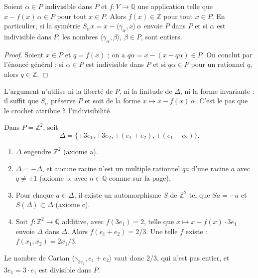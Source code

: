 \begin{enonce}
Soient $\alpha \in P$ indivisible dans $P$ et $f : V \to \mathbb Q$ une application telle que $x - f(x)\,\alpha \in P$ pour tout $x \in P$. Alors $f(x) \in \mathbb Z$ pour tout $x \in P$. En particulier, si la symétrie $S_\alpha x = x - \langle\gamma_\alpha, x\rangle\,\alpha$ envoie $P$ dans $P$ et si $\alpha$ est indivisible dans $P$, les nombres $\langle\gamma_\alpha, \beta\rangle$, $\beta \in P$, sont entiers.
\end{enonce}

\begin{proof}
Soient $x \in P$ et $q = f(x)$ ; on a $q\alpha = x - (x - q\alpha) \in P$. On conclut par l'énoncé général : si $\alpha \in P$ est indivisible dans $P$ et si $q\alpha \in P$ pour un rationnel $q$, alors $q \in \mathbb Z$.
\end{proof}

\begin{remarque}
L'argument n'utilise ni la liberté de $P$, ni la finitude de $\Delta$, ni la forme invariante : il suffit que $S_\alpha$ préserve $P$ et soit de la forme $x \mapsto x - f(x)\,\alpha$. C'est le pas que le crochet attribue à l'indivisibilité.
\end{remarque}

\begin{encadre}
\begin{contrexemple}
Dans $P = \mathbb Z^2$, soit
\[ \Delta = \{\pm 3e_1, \pm 3e_2, \pm(e_1 + e_2), \pm(e_1 - e_2)\}. \]
\begin{enumerate}
\item $\Delta$ engendre $\mathbb Z^2$ (axiome a).
\item $\Delta = -\Delta$, et aucune racine n'est un multiple rationnel $q a$ d'une racine $a$ avec $q \neq \pm 1$ (axiome b, avec $n \in \mathbb Q$ comme sur la page).
\item Pour chaque $a \in \Delta$, il existe un automorphisme $S$ de $\mathbb Z^2$ tel que $S a = -a$ et $S(\Delta) \subset \Delta$ (axiome c).
\item Soit $f : \mathbb Z^2 \to \mathbb Q$ additive, avec $f(3e_1) = 2$, telle que $x \mapsto x - f(x) \cdot 3e_1$ envoie $\Delta$ dans $\Delta$. Alors $f(e_1 + e_2) = 2/3$. Une telle $f$ existe : $f(x_1, x_2) = 2x_1/3$.
\end{enumerate}
Le nombre de Cartan $\langle\gamma_{3e_1}, e_1 + e_2\rangle$ vaut donc $2/3$, qui n'est pas entier, et $3e_1 = 3 \cdot e_1$ est divisible dans $P$.
\end{contrexemple}
\end{encadre}

